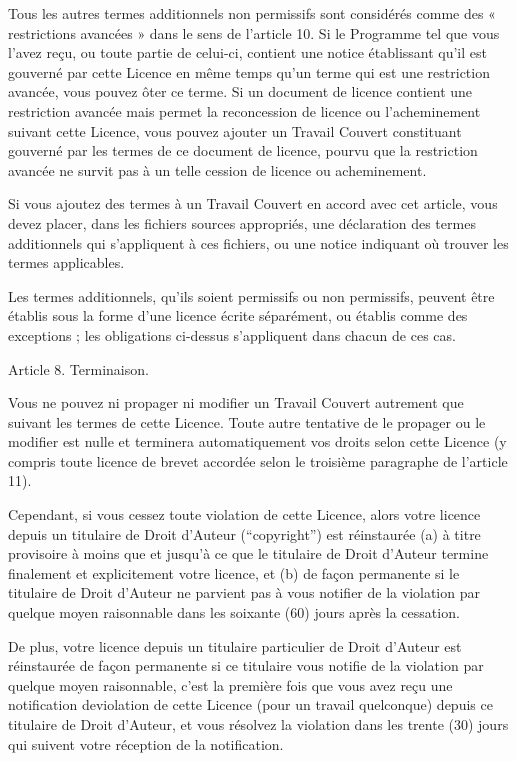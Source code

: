 {Tous les autres termes additionnels non permissifs sont considérés
comme des « restrictions avancées » dans le sens de l’article 10. Si le
Programme tel que vous l’avez reçu, ou toute partie de celui-ci,
contient une notice établissant qu’il est gouverné par cette Licence en
même temps qu’un terme qui est une restriction avancée, vous pouvez
ôter ce terme. Si un document de licence contient une restriction
avancée mais permet la reconcession de licence ou l’acheminement
suivant cette Licence, vous pouvez ajouter un Travail Couvert
constituant gouverné par les termes de ce document de licence, pourvu
que la restriction avancée ne survit pas à un telle cession de licence
ou acheminement.

Si vous ajoutez des termes à un Travail Couvert en accord avec cet
article, vous devez placer, dans les fichiers sources appropriés, une
déclaration des termes additionnels qui s’appliquent à ces fichiers, ou
une notice indiquant où trouver les termes applicables.

Les termes additionnels, qu’ils soient permissifs ou non permissifs,
peuvent être établis sous la forme d’une licence écrite séparément, ou
établis comme des exceptions ; les obligations ci-dessus s’appliquent
dans chacun de ces cas.


Article 8. Terminaison.

Vous ne pouvez ni propager ni modifier un Travail Couvert autrement que
suivant les termes de cette Licence. Toute autre tentative de le
propager ou le modifier est nulle et terminera automatiquement vos
droits selon cette Licence (y compris toute licence de brevet accordée
selon le troisième paragraphe de l’article 11).

Cependant, si vous cessez toute violation de cette Licence, alors votre
licence depuis un titulaire de Droit d’Auteur (“copyright”) est
réinstaurée (a) à titre provisoire à moins que et jusqu’à ce que le
titulaire de Droit d’Auteur termine finalement et explicitement votre
licence, et (b) de façon permanente si le titulaire de Droit d’Auteur
ne parvient pas à vous notifier de la violation par quelque moyen
raisonnable dans les soixante (60) jours après la cessation.

De plus, votre licence depuis un titulaire particulier de Droit
d’Auteur est réinstaurée de façon permanente si ce titulaire vous
notifie de la violation par quelque moyen raisonnable, c’est la
première fois que vous avez reçu une notification deviolation de cette
Licence (pour un travail quelconque) depuis ce titulaire de Droit
d’Auteur, et vous résolvez la violation dans les trente (30) jours qui
suivent votre réception de la notification.

}
